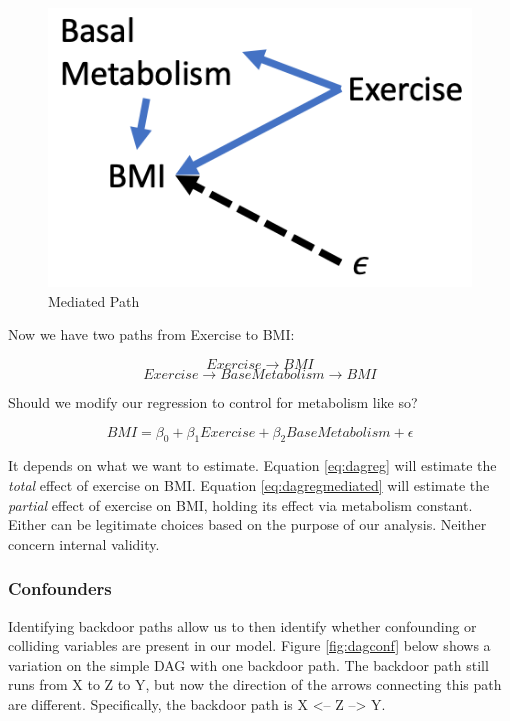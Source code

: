 \documentclass[
]{book}
\begin{document}
\begin{figure}

{\centering \includegraphics[width=\textwidth]{images/dag_reg2} 

}

\caption{Mediated Path}\label{fig:dagmediated}
\end{figure}

Now we have two paths from Exercise to BMI:

\[Exercise \rightarrow BMI\]
\[Exercise \rightarrow BaseMetabolism \rightarrow BMI\]

Should we modify our regression to control for metabolism like so?

\begin{equation}
BMI = \beta_0 + \beta_1Exercise + \beta_2BaseMetabolism + \epsilon
\label{eq:dagregmediated}
\end{equation}

It depends on what we want to estimate. Equation \eqref{eq:dagreg} will estimate the \emph{total} effect of exercise on BMI. Equation \eqref{eq:dagregmediated} will estimate the \emph{partial} effect of exercise on BMI, holding its effect via metabolism constant. Either can be legitimate choices based on the purpose of our analysis. Neither concern internal validity.

\hypertarget{confounders}{%
\subsubsection*{Confounders}\label{confounders}}


Identifying backdoor paths allow us to then identify whether confounding or colliding variables are present in our model. Figure \ref{fig:dagconf} below shows a variation on the simple DAG with one backdoor path. The backdoor path still runs from X to Z to Y, but now the direction of the arrows connecting this path are different. Specifically, the backdoor path is X \textless-- Z --\textgreater{} Y.
\end{document}

